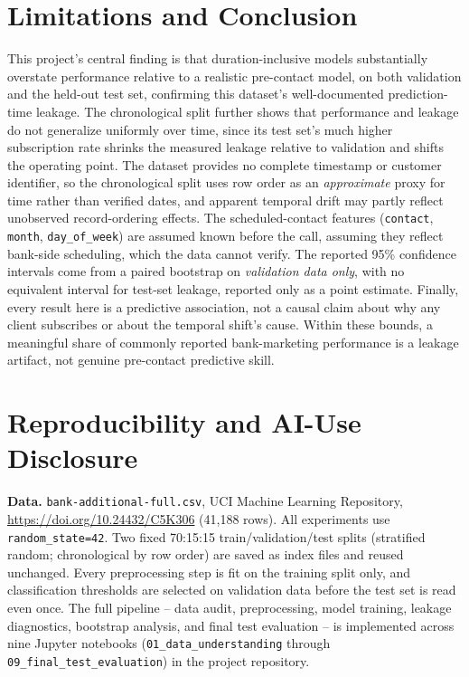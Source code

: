 \documentclass{article}
\begin{document}
\section{Limitations and Conclusion}
This project's central finding is that duration-inclusive models
substantially overstate performance relative to a realistic pre-contact
model, on both validation and the held-out test set, confirming this
dataset's well-documented prediction-time leakage. The chronological split
further shows that performance and leakage do not generalize uniformly over
time, since its test set's much higher subscription rate shrinks the
measured leakage relative to validation and shifts the operating point. The
dataset provides no complete timestamp or customer identifier, so the
chronological split uses row order as an \emph{approximate} proxy for time
rather than verified dates, and apparent temporal drift may partly reflect
unobserved record-ordering effects. The scheduled-contact features
(\texttt{contact}, \texttt{month}, \texttt{day\_of\_week}) are assumed known
before the call, assuming they reflect bank-side scheduling, which the data
cannot verify. The reported 95\% confidence intervals come from a paired
bootstrap on \emph{validation data only}, with no equivalent interval for
test-set leakage, reported only as a point estimate. Finally, every result
here is a predictive association, not a causal claim about why any client
subscribes or about the temporal shift's cause. Within these bounds, a
meaningful share of commonly reported bank-marketing performance is a
leakage artifact, not genuine pre-contact predictive skill.

\section{Reproducibility and AI-Use Disclosure}
\textbf{Data.} \texttt{bank-additional-full.csv}, UCI Machine Learning
Repository, \url{https://doi.org/10.24432/C5K306} (41{,}188 rows). All
experiments use \texttt{random\_state=42}. Two fixed 70:15:15
train/validation/test splits (stratified random; chronological by row
order) are saved as index files and reused unchanged. Every preprocessing
step is fit on the training split only, and classification thresholds are
selected on validation data before the test set is read even once. The full
pipeline -- data audit, preprocessing, model training, leakage diagnostics,
bootstrap analysis, and final test evaluation -- is implemented across nine
Jupyter notebooks (\texttt{01\_data\_understanding} through
\texttt{09\_final\_test\_evaluation}) in the project repository.
\end{document}
